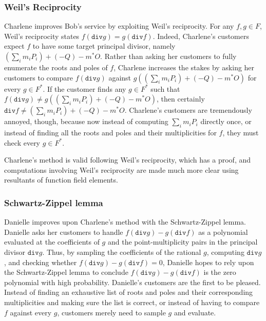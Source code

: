 \documentclass{article}
\theoremstyle{definition}
\newcommand{\6}{\mathbf}
\newcommand{\7}{\mathcal}
\begin{document}
\subsubsection{Weil's Reciprocity}

Charlene improves Bob's service by exploiting Weil's reciprocity. 
For any $f, g \in F$, Weil's reciprocity states $f(\texttt{div}g)=g(\texttt{div}f)$. Indeed, Charlene's customers expect $f$ to have some target principal divisor, namely $(\sum_i m_i P_i) + (-Q) - m^*O$.
Rather than asking her customers to fully enumerate the roots and poles of $f$, Charlene increases the stakes by asking her customers to compare $f(\texttt{div}g)$ against $g((\sum_i m_i P_i) + (-Q) - m^*O)$ for every $g \in F^*$. If the customer finds any $g \in F^*$ such that $f(\texttt{div}g) \neq g((\sum_i m_i P_i) + (-Q) - m^*O)$, then certainly $\texttt{div}f \neq (\sum_i m_i P_i) + (-Q) - m^*O$.
Charlene's customers are tremendously annoyed, though, because now instead of computing $\sum_i m_i P_i$ directly once, or instead of finding all the roots and poles and their multiplicities for $f$, they must check every $g \in F^*$.

Charlene's method is valid following Weil's reciprocity, which has a proof, and computations involving Weil's reciprocity are made much more clear using resultants of function field elements. 

\subsubsection{Schwartz-Zippel lemma}

Danielle improves upon Charlene's method with the Schwartz-Zippel lemma. Danielle asks her customers to handle $f(\texttt{div}g)-g(\texttt{div}f)$ as a polynomial evaluated at the coefficients of $g$ and the point-multiplicity pairs in the principal divisor $\texttt{div}g$. Thus, by sampling the coefficients of the rational $g$, computing $\texttt{div}g$, and checking whether $f(\texttt{div}g)-g(\texttt{div}f) = 0$, Danielle hopes to rely upon the Schwartz-Zippel lemma to conclude $f(\texttt{div}g)-g(\texttt{div}f)$ is the zero polynomial with high probability. 
Danielle's customers are the first to be pleased. Instead of finding an exhaustive list of roots and poles and their corresponding multiplicities and making sure the list is correct, or instead of having to compare $f$ against every $g$, customers merely need to sample $g$ and evaluate. 
\end{document}
